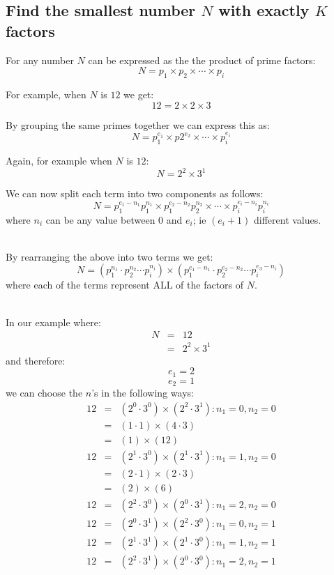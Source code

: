 \documentclass{article}
\begin{document}
\thispagestyle{empty}

\begin{center}
\section*{Find the smallest number $N$ with exactly $K$ factors}
\end{center}


For any number $N$ can be expressed as the the product of prime factors:
$$
N = p_1 \times p_2 \times \cdots \times p_i
$$

For example, when $N$ is $12$ we get:
$$
12 = 2 \times 2 \times 3
$$

By grouping the same primes together we can express this as:
$$
N = p_1 ^ {e_1} \times p2 ^ {e_2} \times 
\cdots \times p_i ^ {e_i}
$$

Again, for example when $N$ is $12$:
$$
N = 2 ^ 2 \times 3 ^ 1
$$

We can now split each term into two components as follows:
$$
N = 
p_1 ^ {e_1 - n_1} p_1 ^ {n_1} \times 
p_1 ^ {e_2 - n_2} p_2 ^ {n_2} \times 
\cdots \times 
p_i ^ {e_i - n_i} p_i ^ {n_i} 
$$
where $n_i$ can be any value between $0$ and $e_i$; ie $(e_i + 1)$ different values.
\\~
\par
By rearranging the above into two terms we get:
$$
N = 
( 
p_1 ^ {n_1} \cdot
p_2 ^ {n_2} 
\cdots 
p_i ^ {n_i}
)
\times
(
p_1 ^ {e_1 - n_1} \cdot
p_2 ^ {e_2 - n_2}
\cdots
p_i ^ {e_3 - n_i}
)
$$
where each of the terms represent ALL of the factors of $N$.
\\~
\par
In our example where:
\begin{eqnarray*}
N & = & 12\\
& = & 2 ^ 2 \times 3 ^ 1
\end{eqnarray*}
and therefore:
$$e_1 = 2$$
$$e_2 = 1$$
we can choose the $n$'s in the following ways:
\begin{eqnarray*}
12 &=& (2^0 \cdot 3^0) \times (2^2 \cdot 3^1) : n_1 = 0, n_2 = 0 \\
   &=& (1 \cdot 1) \times (4 \cdot 3) \\
   &=& (1) \times (12) \\
12 &=& (2^1 \cdot 3^0) \times (2^1 \cdot 3^1) : n_1 = 1, n_2 = 0\\
   &=& (2 \cdot 1) \times (2 \cdot 3) \\
   &=& (2) \times (6) \\
12 &=& (2^2 \cdot 3^0) \times (2^0 \cdot 3^1) : n_1 = 2, n_2 = 0\\
12 &=& (2^0 \cdot 3^1) \times (2^2 \cdot 3^0) : n_1 = 0, n_2 = 1\\
12 &=& (2^1 \cdot 3^1) \times (2^1 \cdot 3^0) : n_1 = 1, n_2 = 1\\
12 &=& (2^2 \cdot 3^1) \times (2^0 \cdot 3^0) : n_1 = 2, n_2 = 1\\
\end{eqnarray*}
\end{document}
